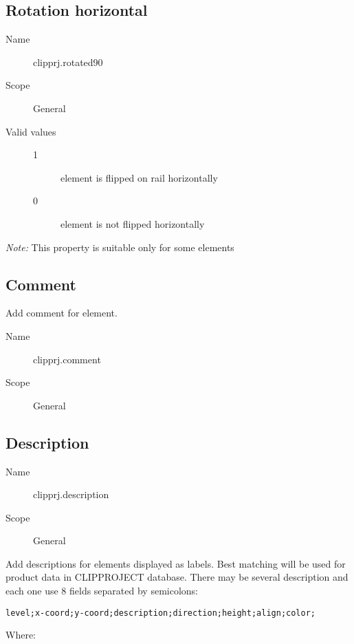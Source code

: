 \documentclass[%
	a4paper,
	oneside,
	listof=numbered,
	parskip=half,
	headsepline=true,
	footsepline=false,
	normalheadings,
	0.7headlines,
	headexclude,
	]{scrbook}
\begin{document}
\subsection{Rotation horizontal}

\begin{description}
	\item[Name] clipprj.rotated90
	\item[Scope] General
	\item[Valid values]
	\begin{description}
		\item[1] element is flipped on rail horizontally
		\item[0] element is not flipped horizontally
	\end{description}
\end{description}

\emph{Note:} This property is suitable only for some elements

\subsection{Comment}

Add comment for element.

\begin{description}
	\item[Name] clipprj.comment
	\item[Scope] General
\end{description}

\subsection{Description}

\begin{description}
	\item[Name] clipprj.description
	\item[Scope] General
\end{description}

Add descriptions for elements displayed as labels.
Best matching will be used for product data in CLIPPROJECT database.
There may be several description and each one use 8 fields separated by semicolons:

\verb|level;x-coord;y-coord;description;direction;height;align;color;|

Where:
\end{document}
